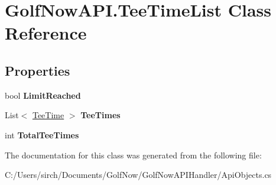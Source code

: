 \hypertarget{class_golf_now_a_p_i_1_1_tee_time_list}{}\section{Golf\+Now\+A\+P\+I.\+Tee\+Time\+List Class Reference}
\label{class_golf_now_a_p_i_1_1_tee_time_list}
\subsection*{Properties}
\begin{DoxyCompactItemize}
\item 
\mbox{\label{class_golf_now_a_p_i_1_1_tee_time_list_aab414eb86330408d1604b3e44fd319ed}} 
bool {\bfseries Limit\+Reached}
\item 
\mbox{\label{class_golf_now_a_p_i_1_1_tee_time_list_ab2a07f11fd45a797acafbef73a0ead1f}} 
List$<$ \mbox{\hyperlink{class_golf_now_a_p_i_1_1_tee_time}{Tee\+Time}} $>$ {\bfseries Tee\+Times}
\item 
\mbox{\label{class_golf_now_a_p_i_1_1_tee_time_list_a07480ebc68f5be65fb859317fe86283a}} 
int {\bfseries Total\+Tee\+Times}
\end{DoxyCompactItemize}


The documentation for this class was generated from the following file\+:\begin{DoxyCompactItemize}
\item 
C\+:/\+Users/sirch/\+Documents/\+Golf\+Now/\+Golf\+Now\+A\+P\+I\+Handler/Api\+Objects.\+cs\end{DoxyCompactItemize}
